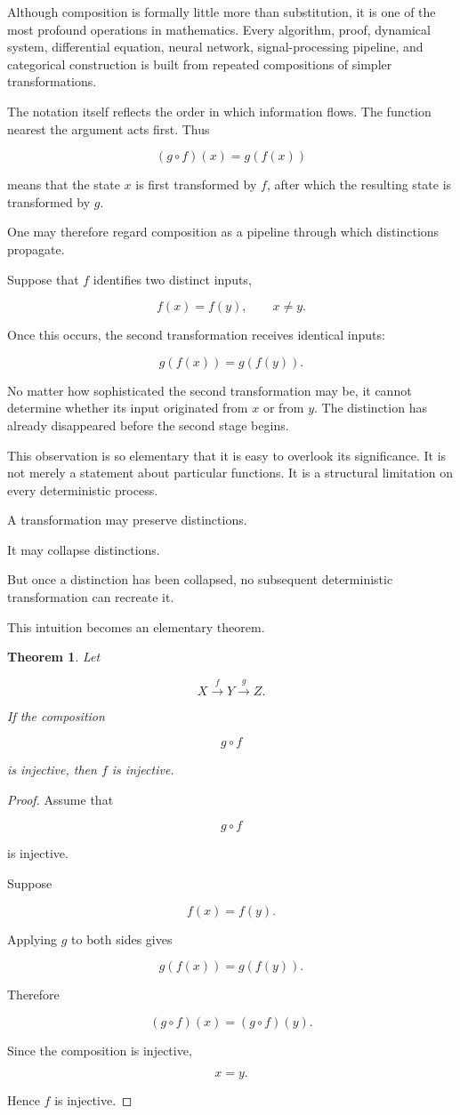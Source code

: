 \documentclass[11pt]{book}
\numberwithin{equation}{chapter}
\theoremstyle{definition}
\theoremstyle{plain}
\newtheorem{theorem}[definition]{Theorem}
\theoremstyle{remark}
\begin{document}
Although composition is formally little more than substitution, it is one of the most profound operations in mathematics. Every algorithm, proof, dynamical system, differential equation, neural network, signal-processing pipeline, and categorical construction is built from repeated compositions of simpler transformations.

The notation itself reflects the order in which information flows. The function nearest the argument acts first. Thus

\[
(g\circ f)(x)
=
g(f(x))
\]

means that the state \(x\) is first transformed by \(f\), after which the resulting state is transformed by \(g\).

One may therefore regard composition as a pipeline through which distinctions propagate.

Suppose that \(f\) identifies two distinct inputs,

\[
f(x)=f(y),
\qquad
x\neq y.
\]

Once this occurs, the second transformation receives identical inputs:

\[
g(f(x))
=
g(f(y)).
\]

No matter how sophisticated the second transformation may be, it cannot determine whether its input originated from \(x\) or from \(y\). The distinction has already disappeared before the second stage begins.

This observation is so elementary that it is easy to overlook its significance. It is not merely a statement about particular functions. It is a structural limitation on every deterministic process.

A transformation may preserve distinctions.

It may collapse distinctions.

But once a distinction has been collapsed, no subsequent deterministic transformation can recreate it.

This intuition becomes an elementary theorem.

\begin{theorem}
Let

\[
X
\xrightarrow{\;f\;}
Y
\xrightarrow{\;g\;}
Z.
\]

If the composition

\[
g\circ f
\]

is injective, then \(f\) is injective.
\end{theorem}

\begin{proof}
Assume that

\[
g\circ f
\]

is injective.

Suppose

\[
f(x)=f(y).
\]

Applying \(g\) to both sides gives

\[
g(f(x))
=
g(f(y)).
\]

Therefore

\[
(g\circ f)(x)
=
(g\circ f)(y).
\]

Since the composition is injective,

\[
x=y.
\]

Hence \(f\) is injective.
\end{proof}
\end{document}
